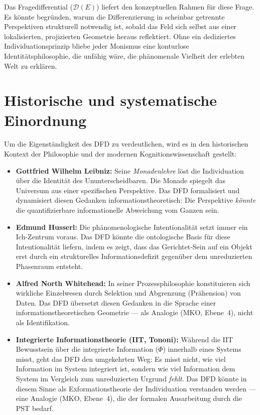 \documentclass[11pt,a4paper]{article}
\theoremstyle{plain}
\theoremstyle{definition}
\begin{document}
Das Fragedifferential ($\mathcal{D}(E)$) liefert den konzeptuellen Rahmen f\"{u}r diese
Frage. Es k\"{o}nnte begr\"{u}nden, warum die Differenzierung in scheinbar getrennte
Perspektiven strukturell notwendig ist, sobald das Feld sich selbst aus einer
lokalisierten, projizierten Geometrie heraus reflektiert. Ohne ein dediziertes
Individuationsprinzip bliebe jeder Monismus eine konturlose Identit\"{a}tsphilosophie,
die unf\"{a}hig w\"{a}re, die ph\"{a}nomenale Vielheit der erlebten Welt zu erkl\"{a}ren.

\section{Historische und systematische Einordnung}

Um die Eigenst\"{a}ndigkeit des DFD zu verdeutlichen, wird es in den historischen Kontext
der Philosophie und der modernen Kognitionswissenschaft gestellt:

\begin{itemize}
  \item \textbf{Gottfried Wilhelm Leibniz:} Seine \emph{Monadenlehre} l\"{o}st die
        Individuation \"{u}ber die Identit\"{a}t des Ununterscheidbaren. Die Monade
        spiegelt das Universum aus einer spezifischen Perspektive. Das DFD formalisiert
        und dynamisiert diesen Gedanken informationstheoretisch: Die Perspektive
        \emph{k\"{o}nnte} die quantifizierbare informationelle Abweichung vom Ganzen
        sein.

  \item \textbf{Edmund Husserl:} Die ph\"{a}nomenologische Intentionalit\"{a}t setzt
        immer ein Ich-Zentrum voraus. Das DFD k\"{o}nnte die ontologische Basis f\"{u}r
        diese Intentionalit\"{a}t liefern, indem es zeigt, dass das
        \glqq{}Gerichtet-Sein\grqq{} auf ein Objekt erst durch ein strukturelles
        Informationsdefizit gegen\"{u}ber dem unreduzierten Phasenraum entsteht.

  \item \textbf{Alfred North Whitehead:} In seiner Prozessphilosophie konstituieren
        sich \glqq{}wirkliche Einzelwesen\grqq{} durch Selektion und Abgrenzung
        (Pr\"{a}hension) von Daten. Das DFD \"{u}bersetzt diesen Gedanken in die Sprache
        einer informationstheoretischen Geometrie --- als Analogie (MKO, Ebene~4),
        nicht als Identifikation.

  \item \textbf{Integrierte Informationstheorie (IIT, Tononi):} W\"{a}hrend die IIT
        Bewusstsein \"{u}ber die integrierte Information ($\Phi$) innerhalb eines
        Systems misst, geht das DFD den umgekehrten Weg: Es misst nicht, wie viel
        Information im System integriert ist, sondern wie viel Information dem System
        im Vergleich zum unreduzierten Urgrund \emph{fehlt}. Das DFD k\"{o}nnte in
        diesem Sinne als \glqq{}Exformationstheorie\grqq{} der Individuation verstanden
        werden --- eine Analogie (MKO, Ebene~4), die der formalen Ausarbeitung durch
        die PST bedarf.
\end{itemize}
\end{document}
